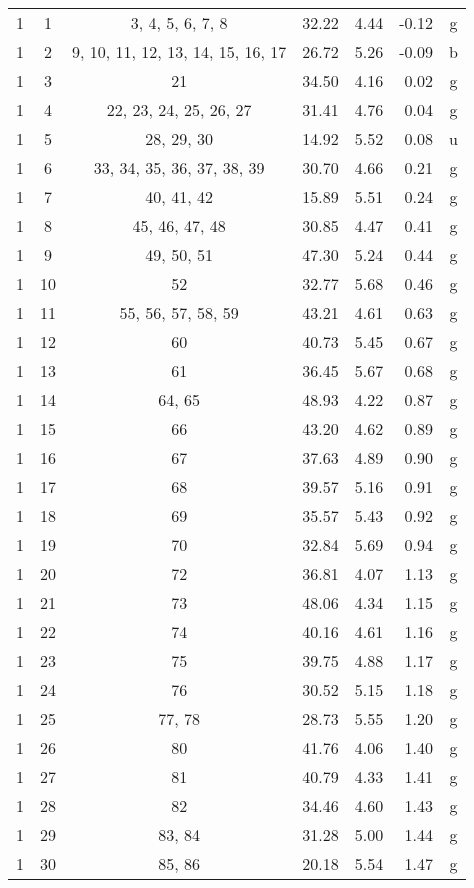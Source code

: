 \begin{center}
\begin{longtable}{cccrrrc}
1 & 1 & 3, 4, 5, 6, 7, 8 & 32.22 &  4.44 & -0.12 & g\\
1 & 2 & 9, 10, 11, 12, 13, 14, 15, 16, 17 & 26.72 &  5.26 & -0.09 & b\\
1 & 3 & 21 & 34.50 &  4.16 &  0.02 & g\\
1 & 4 & 22, 23, 24, 25, 26, 27 & 31.41 &  4.76 &  0.04 & g\\
1 & 5 & 28, 29, 30 & 14.92 &  5.52 &  0.08 & u\\
1 & 6 & 33, 34, 35, 36, 37, 38, 39 & 30.70 &  4.66 &  0.21 & g\\
  1 & 7 & 40, 41, 42 & 15.89 &  5.51 &  0.24 & g\\
  1 & 8 & 45, 46, 47, 48 & 30.85 &  4.47 &  0.41 & g\\
  1 & 9 & 49, 50, 51 & 47.30 &  5.24 &  0.44 & g\\
  1 & 10 & 52 & 32.77 &  5.68 &  0.46 & g\\
  1 & 11 & 55, 56, 57, 58, 59 & 43.21 &  4.61 &  0.63 & g\\
  1 & 12 & 60 & 40.73 &  5.45 &  0.67 & g\\
  1 & 13 & 61 & 36.45 &  5.67 &  0.68 & g\\
  1 & 14 & 64, 65 & 48.93 &  4.22 &  0.87 & g\\
  1 & 15 & 66 & 43.20 &  4.62 &  0.89 & g\\
  1 & 16 & 67 & 37.63 &  4.89 &  0.90 & g\\
  1 & 17 & 68 & 39.57 &  5.16 &  0.91 & g\\
  1 & 18 & 69 & 35.57 &  5.43 &  0.92 & g\\
  1 & 19 & 70 & 32.84 &  5.69 &  0.94 & g\\
  1 & 20 & 72 & 36.81 &  4.07 &  1.13 & g\\
  1 & 21 & 73 & 48.06 &  4.34 &  1.15 & g\\
  1 & 22 & 74 & 40.16 &  4.61 &  1.16 & g\\
  1 & 23 & 75 & 39.75 &  4.88 &  1.17 & g\\
  1 & 24 & 76 & 30.52 &  5.15 &  1.18 & g\\
  1 & 25 & 77, 78 & 28.73 &  5.55 &  1.20 & g\\
  1 & 26 & 80 & 41.76 &  4.06 &  1.40 & g\\
  1 & 27 & 81 & 40.79 &  4.33 &  1.41 & g\\
  1 & 28 & 82 & 34.46 &  4.60 &  1.43 & g\\
  1 & 29 & 83, 84 & 31.28 &  5.00 &  1.44 & g\\
  1 & 30 & 85, 86 & 20.18 &  5.54 &  1.47 & g\\

\end{longtable}
\end{center}
